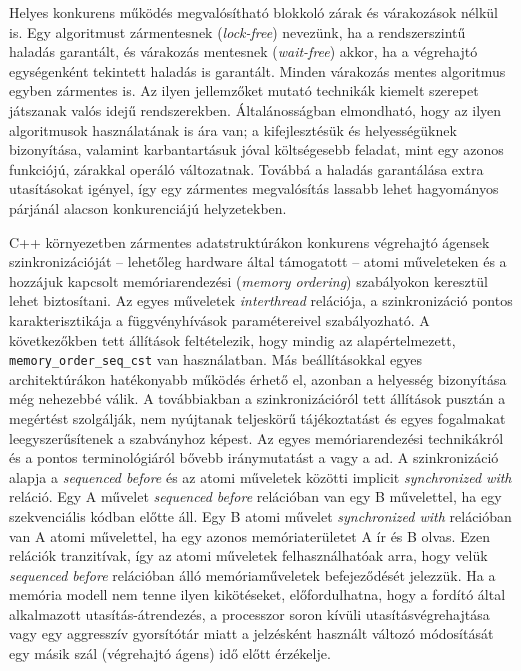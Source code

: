     Helyes konkurens működés megvalósítható blokkoló zárak és várakozások nélkül is. Egy algoritmust zármentesnek (\emph{lock-free}) nevezünk, ha a rendszerszintű haladás garantált, és várakozás mentesnek (\emph{wait-free}) akkor, ha a végrehajtó egységenként tekintett haladás is garantált. Minden várakozás mentes algoritmus egyben zármentes is. Az ilyen jellemzőket mutató technikák kiemelt szerepet játszanak valós idejű rendszerekben. Általánosságban elmondható, hogy az ilyen algoritmusok használatának is ára van; a kifejlesztésük és helyességüknek bizonyítása, valamint karbantartásuk jóval költségesebb feladat, mint egy azonos funkciójú, zárakkal operáló változatnak. Továbbá a haladás garantálása extra utasításokat igényel, így egy zármentes megvalósítás lassabb lehet hagyományos párjánál alacson konkurenciájú helyzetekben.
    
    C++ környezetben zármentes adatstruktúrákon konkurens végrehajtó ágensek szinkronizációját -- lehetőleg hardware által támogatott -- atomi műveleteken és a hozzájuk kapcsolt memóriarendezési (\emph{memory ordering}) szabályokon keresztül lehet biztosítani. Az egyes műveletek \emph{interthread} relációja, a szinkronizáció pontos karakterisztikája a függvényhívások paramétereivel szabályozható. A következőkben tett állítások feltételezik, hogy mindig az alapértelmezett, \texttt{memory\_order\_seq\_cst} van használatban. Más beállításokkal egyes architektúrákon hatékonyabb működés érhető el, azonban a helyesség bizonyítása még nehezebbé válik. A továbbiakban a szinkronizációról tett állítások pusztán a megértést szolgálják, nem nyújtanak teljeskörű tájékoztatást és egyes fogalmakat leegyszerűsítenek a szabványhoz képest. Az egyes memóriarendezési technikákról és a pontos terminológiáról bővebb iránymutatást a \cite{ConcurrencyInAction} vagy a \cite{C++11/MemoryModel} ad. A szinkronizáció alapja a \emph{sequenced before} és az atomi műveletek közötti implicit \emph{synchronized with} reláció. Egy A művelet \emph{sequenced before} relációban van egy B művelettel, ha egy szekvenciális kódban előtte áll. Egy B atomi művelet \emph{synchronized with} relációban van A atomi művelettel, ha egy azonos memóriaterületet A ír és B olvas. Ezen relációk tranzitívak, így az atomi műveletek felhasználhatóak arra, hogy velük \emph{sequenced before} relációban álló memóriaműveletek befejeződését jelezzük. Ha a memória modell nem tenne ilyen kikötéseket, előfordulhatna, hogy a fordító által alkalmazott utasítás-átrendezés, a processzor soron kívüli utasításvégrehajtása vagy egy aggresszív gyorsítótár miatt a jelzésként használt változó módosítását egy másik szál (végrehajtó ágens) idő előtt érzékelje.
    
